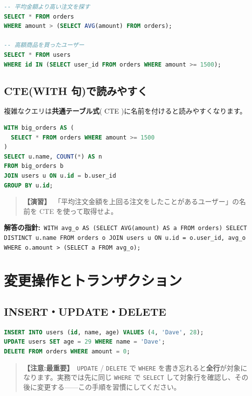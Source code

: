 \documentclass{article}
\begin{document}
\begin{lstlisting}[language=SQL]
-- 平均金額より高い注文を探す
SELECT * FROM orders
WHERE amount > (SELECT AVG(amount) FROM orders);

-- 高額商品を買ったユーザー
SELECT * FROM users
WHERE id IN (SELECT user_id FROM orders WHERE amount >= 1500);
\end{lstlisting}

\subsection{CTE(WITH 句)で読みやすく}

複雑なクエリは\textbf{共通テーブル式}( CTE )に名前を付けると読みやすくなります。

\begin{lstlisting}[language=SQL]
WITH big_orders AS (
  SELECT * FROM orders WHERE amount >= 1500
)
SELECT u.name, COUNT(*) AS n
FROM big_orders b
JOIN users u ON u.id = b.user_id
GROUP BY u.id;
\end{lstlisting}

\begin{quote}
\textbf{【演習】}\ 「平均注文金額を上回る注文をしたことがあるユーザー」の名前を CTE を使って取得せよ。
\end{quote}

\textbf{解答の指針:}\ \texttt{WITH avg\_o AS (SELECT AVG(amount) AS a FROM orders) SELECT DISTINCT u.name FROM orders o JOIN users u ON u.id = o.user\_id, avg\_o WHERE o.amount > (SELECT a FROM avg\_o);}

\section{変更操作とトランザクション}

\subsection{INSERT・UPDATE・DELETE}

\begin{lstlisting}[language=SQL]
INSERT INTO users (id, name, age) VALUES (4, 'Dave', 28);
UPDATE users SET age = 29 WHERE name = 'Dave';
DELETE FROM orders WHERE amount = 0;
\end{lstlisting}

\begin{quote}
\textbf{【注意:最重要】}\ \texttt{UPDATE} / \texttt{DELETE} で \texttt{WHERE} を書き忘れると\textbf{全行}が対象になります。実務では先に同じ \texttt{WHERE} で \texttt{SELECT} して対象行を確認し、その後に変更する——この手順を習慣にしてください。
\end{quote}
\end{document}

